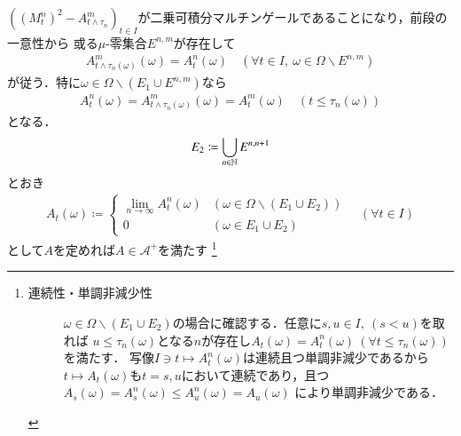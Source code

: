 \begin{prf}
\begin{description}
				$\left( (M_t^n)^2 - A_{t \wedge \tau_n}^m \right)_{t \in I}$が二乗可積分マルチンゲールであることになり，前段の一意性から
				或る$\mu$-零集合$E^{n,m}$が存在して
				\begin{align}
					A_{t \wedge \tau_n(\omega)}^m(\omega) = A_t^n(\omega) \quad (\forall t \in I,\ \omega \in \Omega \backslash E^{n,m})
				\end{align}
				が従う．特に$\omega \in \Omega \backslash (E_1 \cup E^{n,m})$なら
				\begin{align}
					A_t^n(\omega) = A_{t \wedge \tau_n(\omega)}^m(\omega) = A_t^m(\omega) \quad (t \leq \tau_n(\omega))
				\end{align}
				となる．
				\begin{align}
					E_2 \coloneqq \bigcup_{n \in \mathbb{N}} E^{n,n+1}
				\end{align}
				とおき
				\begin{align}
					A_t(\omega) \coloneqq
					\begin{cases}
						\lim_{n \to \infty} A_t^n(\omega) & (\omega \in \Omega \backslash (E_1 \cup E_2)) \\
						0 & (\omega \in E_1 \cup E_2)
					\end{cases}
					\quad (\forall t \in I)
				\end{align}
				として$A$を定めれば$A \in \mathcal{A}^+$を満たす
				\footnote{
					\begin{description}
						\item[連続性・単調非減少性]
							$\omega \in \Omega \backslash (E_1 \cup E_2)$の場合に確認する．任意に$s,u \in I,\ (s < u)$を取れば
							$u \leq \tau_n(\omega)$となる$n$が存在し$A_t(\omega) = A_t^n(\omega)\ (\forall t \leq \tau_n(\omega))$を満たす．
							写像$I \ni t \longmapsto A_t^n(\omega)$は連続且つ単調非減少であるから
							$t \longmapsto A_t(\omega)$も$t = s,u$において連続であり，且つ$A_s(\omega) = A_s^n(\omega) \leq A_u^n(\omega) = A_u(\omega)$
							により単調非減少である．
						

\end{description}}
\end{description}
\end{prf}
